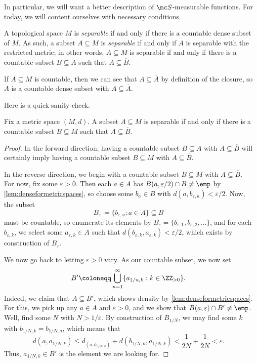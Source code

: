 \documentclass[../notes.tex]{subfiles}
\begin{document}
In particular, we will want a better description of $\mc S$-measurable functions. For today, we will content ourselves with necessary conditions.
\begin{definition}[Separable]
	A topological space $M$ is \textit{separable} if and only if there is a countable dense subset of $M$. As such, a subset $A\subseteq M$ is \textit{separable} if and only if $A$ is separable with the restricted metric; in other words, $A\subseteq M$ is separable if and only if there is a countable subset $B\subseteq A$ such that $A\subseteq\overline B$.
\end{definition}
\begin{example} \label{ex:countable-is-sep}
	If $A\subseteq M$ is countable, then we can see that $A\subseteq\overline A$ by definition of the closure, so $A$ is a countable dense subset with $A\subseteq\overline A$.
\end{example}
Here is a quick sanity check.
\begin{lemma} \label{lem:better-sep}
	Fix a metric space $(M,d)$. A subset $A\subseteq M$ is separable if and only if there is a countable subset $B\subseteq M$ such that $A\subseteq\overline B$.
\end{lemma}
\begin{proof}
	In the forward direction, having a countable subset $B\subseteq A$ with $A\subseteq\overline B$ will certainly imply having a countable subset $B\subseteq M$ with $A\subseteq\overline B$.

	In the reverse direction, we begin with a countable subset $B\subseteq M$ with $A\subseteq\overline B$. For now, fix some $\varepsilon>0$. Then each $a\in A$ has $B(a,\varepsilon/2)\cap B\ne\emp$ by \autoref{lem:denseformetricspaces}, so choose some $b_a\in B$ with $d(a,b_{\varepsilon,a})<\varepsilon/2$. Now, the subset
	\[B_\varepsilon\coloneqq\{b_{\varepsilon,a}:a\in A\}\subseteq B\]
	must be countable, so enumerate its elements by $B_\varepsilon=\{b_{\varepsilon,1},b_{\varepsilon,2},\ldots\}$, and for each $b_{\varepsilon,k}$, we select some $a_{\varepsilon,k}\in A$ such that $d(b_{\varepsilon,k},a_{\varepsilon,k})<\varepsilon/2$, which exists by construction of $B_\varepsilon$.

	We now go back to letting $\varepsilon>0$ vary. As our countable subset, we now set
	\[B'\coloneqq\bigcup_{n=1}^\infty\{a_{1/n,k}:k\in\ZZ_{>0}\}.\]
	Indeed, we claim that $A\subseteq\overline {B'}$, which shows density by \autoref{lem:denseformetricspaces}. For this, we pick up any $a\in A$ and $\varepsilon>0$, and we show that $B(a,\varepsilon)\cap B'\ne\emp$. Well, find some $N$ with $N>1/\varepsilon$. By construction of $B_{1/N}$, we may find some $k$ with $b_{1/N,k}=b_{1/N,a}$, which means that
	\[d(a,a_{1/N,k})\le d_(a,b_{1/N,k})+d(b_{1/N,k},a_{1/N,k})<\frac1{2N}+\frac1{2N}<\varepsilon.\]
	Thus, $a_{1/N,k}\in B'$ is the element we are looking for.
\end{proof}
\end{document}
